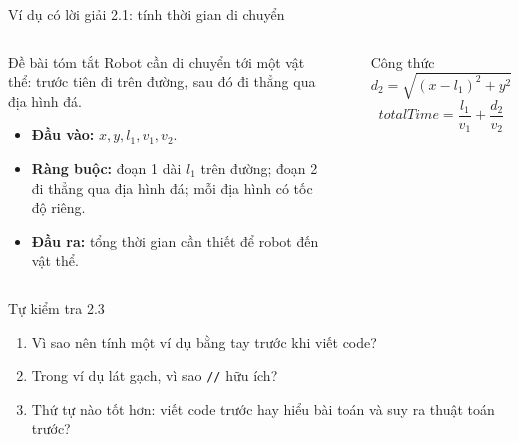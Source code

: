\documentclass[aspectratio=169,10pt]{beamer}
\begin{document}
\begin{frame}{Ví dụ có lời giải 2.1: tính thời gian di chuyển}
\small
\begin{columns}[T,totalwidth=0.92\textwidth]
\begin{block}{Đề bài tóm tắt}
Robot cần di chuyển tới một vật thể: trước tiên đi trên đường, sau đó đi thẳng qua địa hình đá.
\begin{itemize}
  \item \textbf{Đầu vào:} $x,y,l_1,v_1,v_2$.
  \item \textbf{Ràng buộc:} đoạn 1 dài $l_1$ trên đường; đoạn 2 đi thẳng qua địa hình đá; mỗi địa hình có tốc độ riêng.
  \item \textbf{Đầu ra:} tổng thời gian cần thiết để robot đến vật thể.
\end{itemize}
\end{block}
\hfill
{}
\begin{center}
\end{center}
\vspace{0.18cm}
\begin{block}{Công thức}
\[
 d_2=\sqrt{(x-l_1)^2+y^2}
\]
\[
 totalTime=\frac{l_1}{v_1}+\frac{d_2}{v_2}
\]
\end{block}
\end{columns}
\end{frame}

\begin{frame}{Tự kiểm tra 2.3}
\begin{enumerate}
  \item Vì sao nên tính một ví dụ bằng tay trước khi viết code?
  \item Trong ví dụ lát gạch, vì sao \texttt{//} hữu ích?
  \item Thứ tự nào tốt hơn: viết code trước hay hiểu bài toán và suy ra thuật toán trước?
\end{enumerate}
\end{frame}
\end{document}
